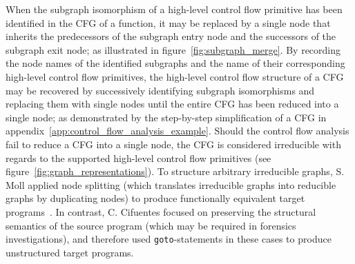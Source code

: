 When the subgraph isomorphism of a high-level control flow primitive has been identified in the CFG of a function, it may be replaced by a single node that inherits the predecessors of the subgraph entry node and the successors of the subgraph exit node; as illustrated in figure~\ref{fig:subgraph_merge}. By recording the node names of the identified subgraphs and the name of their corresponding high-level control flow primitives, the high-level control flow structure of a CFG may be recovered by successively identifying subgraph isomorphisms and replacing them with single nodes until the entire CFG has been reduced into a single node; as demonstrated by the step-by-step simplification of a CFG in appendix~\ref{app:control_flow_analysis_example}. Should the control flow analysis fail to reduce a CFG into a single node, the CFG is considered irreducible with regards to the supported high-level control flow primitives (see figure~\ref{fig:graph_representations}). To structure arbitrary irreducible graphs, S. Moll applied node splitting (which translates irreducible graphs into reducible graphs by duplicating nodes) to produce functionally equivalent target programs~\cite{decomp_of_llvm}. In contrast, C. Cifuentes focused on preserving the structural semantics of the source program (which may be required in forensics investigations), and therefore used \texttt{goto}-statements in these cases to produce unstructured target programs.

